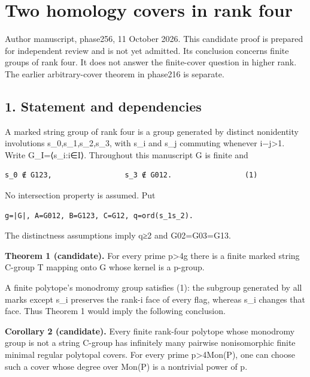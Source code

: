 \documentclass[
  11pt,
  a4paper,
]{article}
\author{}
\date{}
\begin{document}
\section{Two homology covers in rank
four}\label{two-homology-covers-in-rank-four}

Author manuscript, phase256, 11 October 2026. This candidate proof is
prepared for independent review and is not yet admitted. Its conclusion
concerns finite groups of rank four. It does not answer the finite-cover
question in higher rank. The earlier arbitrary-cover theorem in phase216
is separate.

\subsection{1. Statement and
dependencies}\label{statement-and-dependencies}

A marked string group of rank four is a group generated by distinct
nonidentity involutions s\_0,s\_1,s\_2,s\_3, with s\_i and s\_j
commuting whenever \textbar i−j\textbar\textgreater1. Write
G\_I=⟨s\_i:i∈I⟩. Throughout this manuscript G is finite and

\begin{verbatim}
s_0 ∉ G123,                 s_3 ∉ G012.                 (1)
\end{verbatim}

No intersection property is assumed. Put

\begin{verbatim}
g=|G|, A=G012, B=G123, C=G12, q=ord(s_1s_2).
\end{verbatim}

The distinctness assumptions imply q≥2 and
\textbar G02\textbar=\textbar G03\textbar=\textbar G13.

\textbf{Theorem 1 (candidate).} For every prime p\textgreater4g there is
a finite marked string C-group T mapping onto G whose kernel is a
p-group.

A finite polytope's monodromy group satisfies (1): the subgroup
generated by all marks except s\_i preserves the rank-i face of every
flag, whereas s\_i changes that face. Thus Theorem 1 would imply the
following conclusion.

\textbf{Corollary 2 (candidate).} Every finite rank-four polytope whose
monodromy group is not a string C-group has infinitely many pairwise
nonisomorphic finite minimal regular polytopal covers. For every prime
p\textgreater4\textbar Mon(P)\textbar, one can choose such a cover whose
degree over Mon(P) is a nontrivial power of p.
\end{document}
